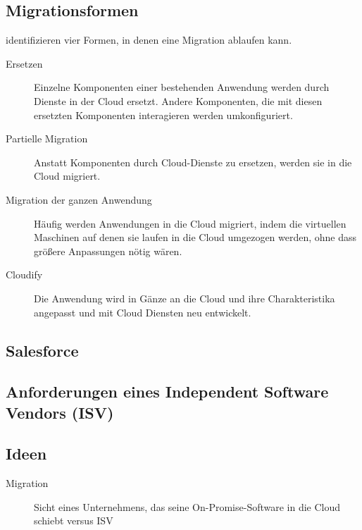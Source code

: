 \subsection{Migrationsformen}
 identifizieren vier Formen, in denen eine 
Migration ablaufen kann.
\begin{description}
	\item[Ersetzen] Einzelne Komponenten einer bestehenden Anwendung werden 
durch Dienste in der Cloud ersetzt. Andere Komponenten, die mit diesen 
ersetzten Komponenten interagieren werden umkonfiguriert.
	\item[Partielle Migration] Anstatt Komponenten durch Cloud-Dienste zu 
ersetzen, werden sie in die Cloud migriert.
	\item[Migration der ganzen Anwendung] Häufig werden Anwendungen in die 
Cloud migriert, indem die virtuellen Maschinen auf denen sie laufen in die 
Cloud umgezogen werden, ohne dass größere Anpassungen nötig wären.
	\item[Cloudify] Die Anwendung wird in Gänze an die Cloud und ihre 
Charakteristika angepasst und mit Cloud Diensten neu entwickelt.
\end{description}

\subsection{Salesforce}

\subsection{Anforderungen eines Independent Software Vendors (ISV)}

\subsection{Ideen}
\begin{description}
	\item[Migration] Sicht eines Unternehmens, das seine 
On-Promise-Software in die Cloud schiebt versus ISV
\end{description}


